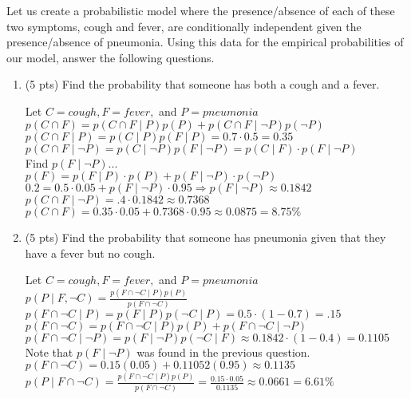\documentclass[11pt]{article}
\begin{document}
Let us create a probabilistic model where the presence/absence of each of these two symptoms, cough and fever, are conditionally independent given the presence/absence of pneumonia. Using this data for the empirical probabilities of our model, answer the following questions.
\begin{enumerate}
\item (5 pts) Find the probability that someone has both a cough and a fever.  \\
\begin{answertext}{6.5cm}{}

Let $C = cough, F = fever,$ and $P = pneumonia$\\
$p(C \cap F) = p(C \cap F \mid P)p(P) + p(C \cap F \mid \lnot P)p(\lnot P)$\\
$p(C \cap F \mid P) = p(C \mid P)p(F \mid P) = 0.7 \cdot 0.5 = 0.35$\\
$p(C \cap F \mid \lnot P) = p(C \mid \lnot P)p(F \mid \lnot P) = p(C \mid F) \cdot p(F \mid \lnot P)$\\
Find $p(F \mid \lnot P)$...\\
$p(F) = p(F \mid P) \cdot p(P) + p(F \mid \lnot P)\cdot p(\lnot P)$\\
$0.2 = 0.5 \cdot 0.05 + p(F \mid \lnot P) \cdot 0.95 \Longrightarrow p(F \mid \lnot P) \approx 0.1842$\\
$p(C \cap F \mid \lnot P) = .4 \cdot 0.1842 \approx 0.7368$\\
$p(C \cap F) = 0.35 \cdot 0.05 + 0.7368 \cdot 0.95 \approx 0.0875 = 8.75\%$
  
\end{answertext} 
\item (5 pts) Find the probability that someone has pneumonia given that they have a fever but no cough.  \\
\begin{answertext}{6cm}{}

Let $C = cough, F = fever,$ and $P = pneumonia$\\
$p(P \mid F, \lnot C) = \frac{p(F \cap \lnot C \mid P)p(P)}{p(F \cap \lnot C)}$\\
$p(F \cap \lnot C \mid P) = p(F \mid P)p(\lnot C \mid P) = 0.5 \cdot (1 - 0.7) = .15$\\
$p(F \cap \lnot C) = p(F \cap \lnot C \mid P)p(P) + p(F \cap \lnot C \mid \lnot P)$\\
$p(F \cap \lnot C \mid \lnot P) =  p(F \mid \lnot P)p(\lnot C \mid F) \approx 0.1842 \cdot (1 - 0.4) = 0.1105$\\
Note that $p(F \mid \lnot P)$ was found in the previous question.\\
$p(F \cap \lnot C) = 0.15(0.05) + 0.11052(0.95) \approx 0.1135$\\
$p(P \mid F \cap \lnot C) = \frac{p(F \cap \lnot C \mid P)p(P)}{p(F \cap \lnot C)} = \frac{0.15 \cdot 0.05}{0.1135} \approx 0.0661 = 6.61\%$


\end{answertext}
\end{enumerate}
\end{document}
